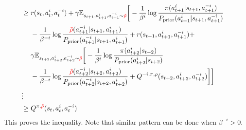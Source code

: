\begin{equation*}
\begin{aligned}
\begin{aligned}[t]
    \end{aligned} \\ 
    &\ge \begin{aligned}[t]
        &r(s_t, a^i_t, a^{-i}_t) + \gamma \mathbb{E}_{s_{t+1}, a^i_{t+1}, a^{-i}_{t+1} \sim {\color{red} \tilde{\rho}}} \bigg[ - \frac{1}{\beta^{i}}\log \frac{\pi(a^i_{t+1} | s_{t+1}, a^{-i}_{t+1})}{P_{\text{prior}}(a^i_{t+1} | s_{t+1}, a^{-i}_{t+1}) } \\
        & - \frac{1}{\beta^{-i}}\log \frac{{\color{red} \tilde{\rho}}(a^{-i}_{t+1} | s_{t+1}, a^i_{t+1})}{P_{\text{prior}}(a^{-i}_{t+1} | s_{t+1}, a^i_{t+1})}  +  r(s_{t+1}, a^i_{t+1}, a^{-i}_{t+1}) + \\
        &\gamma \mathbb{E}_{s_{t+2}, a^i_{t+2}, a^{-i}_{t+2} \sim {\color{red} \tilde{\rho}}} \bigg[ - \frac{1}{\beta^{i}}\log \frac{\pi(a^i_{t+2} | s_{t+2})}{P_{\text{prior}}(a^i_{t+2} | s_{t+2}) } \\
        & - \frac{1}{\beta^{-i}}\log \frac{{\color{red} \tilde{\rho}}(a^{-i}_{t+2} | s_{t+2}, a^i_{t+2})}{P_{\text{prior}}(a^{-i}_{t+2} | s_{t+2}, a^i_{t+2})}  + Q^{-i, \pi, \rho}(s_{t+2}, a^i_{t+2}, a^{-i}_{t+2}) \bigg]\bigg]
    \end{aligned} \\ 
    &\vdots \\
    & \ge Q^{\pi, {\color{red} \tilde{\rho}}}(s_t, a^i_t, a^{-i}_t)
\end{aligned}
\end{equation*}
This proves the inequality. Note that similar pattern can be done when $\beta^{-i} > 0$. 